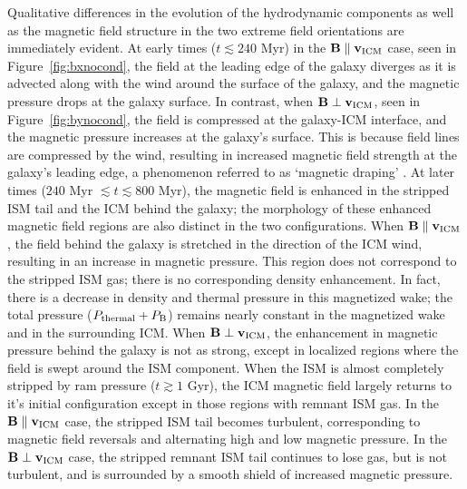 \documentclass[twocolumn]{aastex6}
\begin{document}
Qualitative differences in the evolution of the hydrodynamic components as well as the magnetic field structure in the two extreme field orientations are immediately evident. At early times ($t \lesssim 240$ Myr) in the $\mathbf{B} \parallel \mathbf{v_{\rm ICM}}$ case, seen in Figure~\ref{fig:bxnocond}, the field at the leading edge of the galaxy diverges as it is advected along with the wind around the surface of the galaxy, and the magnetic pressure drops at the galaxy surface. In contrast, when $\mathbf{B} \perp \mathbf{v_{\rm ICM}}$, seen in Figure~\ref{fig:bynocond}, the field is compressed at the galaxy-ICM interface, and the magnetic pressure increases at the galaxy's surface. This is because field lines are compressed by the wind, resulting in increased magnetic field strength at the galaxy's leading edge, a phenomenon referred to as `magnetic draping' \citep{Lyutikov06,Dursi08}.  At later times ($240 $ Myr $\lesssim t \lesssim 800$ Myr), the magnetic field is enhanced in the stripped ISM tail and the ICM behind the galaxy; the morphology of these enhanced magnetic field regions are also distinct in the two configurations. When $\mathbf{B} \parallel \mathbf{v_{\rm ICM}}$, the field behind the galaxy is stretched in the direction of the ICM wind, resulting in an increase in magnetic pressure. This region does not correspond to the stripped ISM gas; there is no corresponding density enhancement. In fact, there is a decrease in density and thermal pressure in this magnetized wake; the total pressure ($P_{\rm thermal} + P_{\rm B}$) remains nearly constant in the magnetized wake and in the surrounding ICM. When $\mathbf{B} \perp \mathbf{v_{\rm ICM}}$, the enhancement in magnetic pressure behind the galaxy is not as strong, except in localized regions where the field is swept around the ISM component. When the ISM is almost completely stripped by ram pressure ($t \gtrsim 1$ Gyr), the ICM magnetic field largely returns to it's initial configuration except in those regions with remnant ISM gas. In the $\mathbf{B} \parallel \mathbf{v_{\rm ICM}}$ case, the stripped ISM tail becomes turbulent, corresponding to magnetic field reversals and alternating high and low magnetic pressure. In the $\mathbf{B} \perp \mathbf{v_{\rm ICM}}$ case, the stripped remnant ISM tail continues to lose gas, but is not turbulent, and is surrounded by a smooth shield of increased magnetic pressure.
\end{document}
